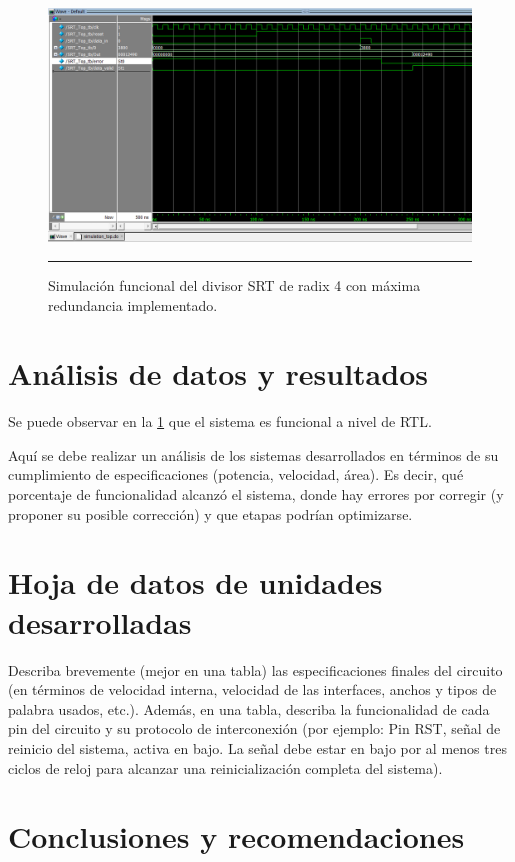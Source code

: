 \documentclass[12pt,a4paper]{article} %
\begin{document}
\begin{figure}[htbp]
  \centering
    \includegraphics[scale=0.7]{./img/Simulation.png}
    \rule{35em}{0.5pt}
  \caption[Sim]{Simulación funcional del divisor SRT de radix 4 con máxima redundancia implementado.}
  \label{fig:Sim}
\end{figure}

\section{Análisis de datos y resultados}

Se puede observar en la  \ref{fig:Sim}  que el sistema es funcional a nivel de RTL.

Aquí se debe realizar un análisis de los sistemas desarrollados en términos de su cumplimiento de especificaciones (potencia, velocidad, área). Es decir, qué porcentaje de funcionalidad alcanzó el sistema, donde hay errores por corregir (y proponer su posible corrección) y que etapas podrían optimizarse. 

\section{Hoja de datos de unidades desarrolladas}

Describa brevemente (mejor en una tabla) las especificaciones finales del circuito (en términos de velocidad interna, velocidad de las interfaces, anchos y tipos de palabra usados, etc.). Además, en una tabla, describa la funcionalidad de cada pin del circuito y su protocolo de interconexión (por ejemplo: Pin RST, señal de reinicio del sistema, activa en bajo. La señal debe estar en bajo por al menos tres ciclos de reloj para alcanzar una reinicialización completa del sistema).

\section{Conclusiones y recomendaciones}
\end{document}
